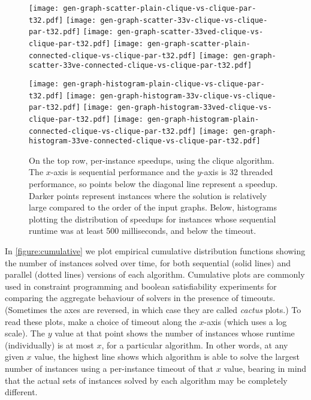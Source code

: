 \documentclass[sigconf]{acmart}
\begin{document}
\begin{figure*}[p]
    \texttt{[image: gen-graph-scatter-plain-clique-vs-clique-par-t32.pdf]}
    \hfill
    \texttt{[image: gen-graph-scatter-33v-clique-vs-clique-par-t32.pdf]}
    \hfill
    \texttt{[image: gen-graph-scatter-33ved-clique-vs-clique-par-t32.pdf]}
    \hfill
    \texttt{[image: gen-graph-scatter-plain-connected-clique-vs-clique-par-t32.pdf]}
    \hfill
    \texttt{[image: gen-graph-scatter-33ve-connected-clique-vs-clique-par-t32.pdf]}

    \vspace*{1em}

    \texttt{[image: gen-graph-histogram-plain-clique-vs-clique-par-t32.pdf]}
    \hfill
    \texttt{[image: gen-graph-histogram-33v-clique-vs-clique-par-t32.pdf]}
    \hfill
    \texttt{[image: gen-graph-histogram-33ved-clique-vs-clique-par-t32.pdf]}
    \hfill
    \texttt{[image: gen-graph-histogram-plain-connected-clique-vs-clique-par-t32.pdf]}
    \hfill
    \texttt{[image: gen-graph-histogram-33ve-connected-clique-vs-clique-par-t32.pdf]}

    \caption{On the top row, per-instance speedups, using the clique algorithm. The $x$-axis is
    sequential performance and the $y$-axis is 32 threaded performance, so points below the diagonal
    line represent a speedup. Darker points represent instances where the solution is relatively
    large compared to the order of the input graphs. Below, histograms plotting the distribution of
    speedups for instances whose sequential runtime was at least 500 milliseconds, and below the
    timeout.}\label{figure:cliquespeedups}
\end{figure*}

In \cref{figure:cumulative} we plot empirical cumulative distribution functions showing the number
of instances solved over time, for both sequential (solid lines) and parallel (dotted lines)
versions of each algorithm.  Cumulative plots are commonly used in constraint programming and
boolean satisfiability experiments for comparing the aggregate behaviour of solvers in the presence
of timeouts.  (Sometimes the axes are reversed, in which case they are called \emph{cactus} plots.)
To read these plots, make a choice of timeout along the $x$-axis (which uses a log scale). The $y$
value at that point shows the number of instances whose runtime (individually) is at most $x$, for a
particular algorithm. In other words, at any given $x$ value, the highest line shows which algorithm
is able to solve the largest number of instances using a per-instance timeout of that $x$ value,
bearing in mind that the actual sets of instances solved by each algorithm may be completely
different.
\end{document}

